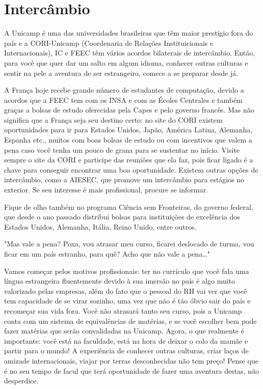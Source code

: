 \section{Intercâmbio}

A Unicamp é uma das universidades brasileiras que têm maior prestígio fora do país
e a CORI-Unicamp (Coordenaria de Relações Instituicionais e Internacionais), IC e FEEC têm
vários acordos bilaterais de intercâmbio. Então, para você que quer dar um salto
em algum idioma, conhecer outras culturas e sentir na pele a aventura de ser
estrangeiro, comece a se preparar desde já.

A França hoje recebe grande número de estudantes de computação, devido a acordos que
a FEEC tem com os INSA e com as Écoles Centrales e também graças a bolsas de
estudo oferecidas pela Capes e pelo governo francês. Mas não significa que
a França seja seu destino certo: no site do CORI existem oportunidades para ir
para Estados Unidos, Japão, América Latina, Alemanha, Espanha etc., muitos com boas bolsas
de estudo ou com incentivos que valem a pena caso você
tenha um pouco de grana para se sustentar no início. Visite sempre o site da
CORI e participe das reuniões que ela faz, pois ficar ligado é a chave para conseguir
encontrar uma boa oportunidade. Existem outras opções de intercâmbio, como
a AIESEC, que promove um intercâmbio para estágios no exterior. Se seu interesse
é mais profissional, procure se informar.

Fique de olho também no programa Ciência sem Fronteiras, do governo federal,
que desde o ano passado distribui bolsas para instituições de excelência dos Estados Unidos, Alemanha, Itália,
Reino Unido, entre outros.

"Mas vale a pena? Poxa, vou atrasar meu curso, ficarei deslocado de turma, vou
ficar em um país estranho, para quê? Acho que não vale a pena{\dots}"

Vamos começar pelos motivos profissionais: ter no currículo que você fala uma
língua estrangeira fluentemente devido à sua imersão no país é algo muito
valorizado pelas empresas, além do fato que o pessoal do RH vai ver que você tem
capacidade de se virar sozinho, uma vez que não é tão óbvio sair do país
e recomeçar sua vida fora. Você não atrasará tanto seu curso, pois a Unicamp
conta com um sistema de equivalências de matérias, e se você escolher bem pode
fazer matérias que serão convalidadas na Unicamp. Agora, o que realmente
é importante: você está na faculdade, está na hora de deixar o colo da mamãe
e partir para o mundo! A experiência de conhecer outras culturas, criar
laços de amizade internacionais, viajar por terras
desconhecidas não tem preço! Pense que é no seu tempo de facul que terá
oportunidade de fazer uma aventura destas, não desperdice.

